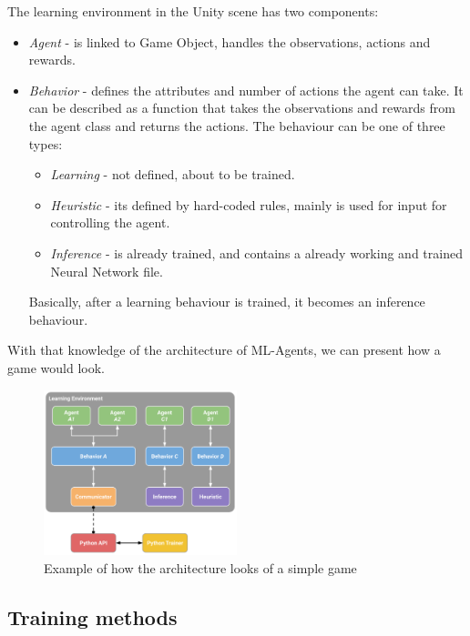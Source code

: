 \documentclass[a4paper, 12pt]{book}
\begin{document}
\clearpage

The learning environment in the Unity scene has two components:
\begin{itemize}
    \item \emph{Agent} - is linked to Game Object, handles the observations, actions and rewards.
    \item \emph{Behavior} - defines the attributes and number of actions the agent can take. It can be described as a function that takes the observations and rewards from the agent class and returns the actions. The behaviour can be one of three types:
    \begin{itemize}
        \item \emph{Learning} - not defined, about to be trained.
        \item \emph{Heuristic} - its defined by hard-coded rules, mainly is used for input for controlling the agent.
        \item \emph{Inference} - is already trained, and contains a already working and trained Neural Network file.
    \end{itemize}
    Basically, after a learning behaviour is trained, it becomes an inference behaviour.
\end{itemize}

With that knowledge of the architecture of ML-Agents, we can present how a game would look.

\begin{figure}[h]
\begin{center}
\includegraphics[width=0.5\textwidth]{Images/learning_environment_example.png}
\end{center}
\caption{Example of how the architecture looks of a simple game}
\label{pic7}
\end{figure}

\subsection{Training methods}
\end{document}
